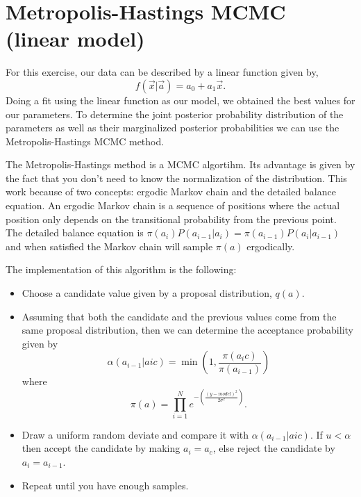 \section{Metropolis-Hastings MCMC (linear model)}

For this exercise, our data can be described by a linear function given by,
\begin{equation}
    f(\Vec{x}|\Vec{a})=a_0 + a_1\Vec{x}. 
    \label{eq:linearModel}
\end{equation}
Doing a fit using the linear function as our model, we obtained the best values for our parameters.
To determine the joint posterior probability distribution of the parameters as well as their marginalized posterior probabilities we can use the Metropolis-Hastings MCMC method.

The Metropolis-Hastings method is a MCMC algortihm. Its advantage is given by the fact that you don't need to know the normalization of the distribution. 
This work because of two concepts: ergodic Markov chain and the detailed balance equation. 
An ergodic Markov chain is a sequence of positions where the actual position only depends on the transitional probability from the previous point. 
The detailed balance equation is $\pi(a_i)P(a_{i-1}|a_{i})=\pi(a_{i-1})P(a_{i}|a_{i-1})$ and when satisfied the Markov chain will sample $\pi(a)$ ergodically. 

The implementation of this algorithm is the following:
\begin{itemize}
    \item Choose a candidate value given by a proposal distribution, $q(a)$. 
    \item Assuming that both the candidate and the previous values come from the same proposal distribution, then we can determine the acceptance probability given by 
    \begin{equation}
        \alpha(a_{i-1}|a{ic})=\min\left(1,\frac{\pi(a_ic)}{\pi(a_{i-1})}\right)
    \end{equation} where
    \begin{equation}
        \pi(a)=\prod^N_{i=1}e^{-\left(\frac{(y-model)^2}{2\sigma^2}\right)}.
        \label{eq:piMCMC}
    \end{equation}
    \item Draw a uniform random deviate and compare it with $\alpha(a_{i-1}|a{ic})$. If $u<\alpha$ then accept the candidate by making $a_i=a_c$, else reject the candidate by $a_i=a_{i-1}$.
    \item Repeat until you have enough samples.
\end{itemize}


